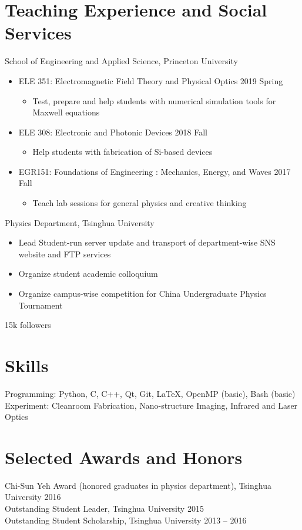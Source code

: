 \documentclass[11pt,letterpaper]{resume}
\begin{document}
\section{Teaching Experience and Social Services}
School of Engineering and Applied Science, Princeton University
\begin{itemize}
    \item ELE 351: Electromagnetic Field Theory and Physical Optics
    \hfill 2019 Spring
    \begin{itemize}
        \item Test, prepare and help students with 
        numerical simulation tools for Maxwell equations
    \end{itemize}
    \item ELE 308: Electronic and Photonic Devices
    \hfill 2018 Fall
    \begin{itemize}
        \item Help students with fabrication of Si-based devices
    \end{itemize}
    \item EGR151: Foundations of Engineering : Mechanics, Energy, and Waves
    \hfill 2017 Fall
    \begin{itemize}
        \item Teach lab sessions for general physics and creative thinking
    \end{itemize}
\end{itemize}\medskip

Physics Department, Tsinghua University
\begin{itemize}
    \item Lead Student-run server update and transport of department-wise SNS 
    website and FTP services
    \item Organize student academic colloquium 
    \item Organize campus-wise competition for China Undergraduate Physics 
    Tournament
\end{itemize}\medskip

15k followers

\section{Skills}
Programming: Python, C, C++, Qt, Git, \LaTeX, OpenMP (basic), Bash (basic)\\
Experiment: Cleanroom Fabrication, Nano-structure Imaging, 
Infrared and Laser Optics

\section{Selected Awards and Honors} 
Chi-Sun Yeh Award (honored graduates in physics department), Tsinghua University \hfill 2016 \\
Outstanding Student Leader, Tsinghua University \hfill 2015 \\
Outstanding Student Scholarship, Tsinghua University \hfill 2013 -- 2016\\
\end{document}
